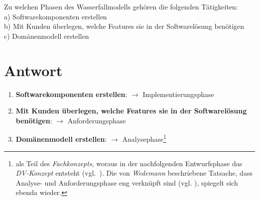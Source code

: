 Zu welchen Phasen des Wasserfallmodells gehören die folgenden Tätigkeiten:\\
\noindent
a) Softwarekomponenten erstellen\\
b) Mit Kunden überlegen, welche Features sie in der Softwarelösung benötigen\\
c) Domänenmodell erstellen\\


\section*{Antwort}

\begin{enumerate}
    \item \textbf{Softwarekomponenten erstellen}: $\rightarrow$ Implementierungsphase
    \item \textbf{Mit Kunden überlegen, welche Features sie in der Softwarelösung benötigen}: $\rightarrow$ Anforderungsphase
    \item \textbf{Domänenmodell erstellen}: $\rightarrow$ Analysephase\footnote{
     als Teil des \textit{Fachkonzepts}, woraus in der nachfolgenden Entwurfsphase das \textit{DV-Konzept} entsteht (vgl.~\cite[318, Abbildung 14-3]{AABG14n}).
        Die von \textit{Wedemann} beschriebene Tatsache, dass Analyse- und Anforderungsphase eng verknüpft sind (vgl. \cite[18]{Wed09}), spiegelt sich ebenda wieder.
    }
\end{enumerate}